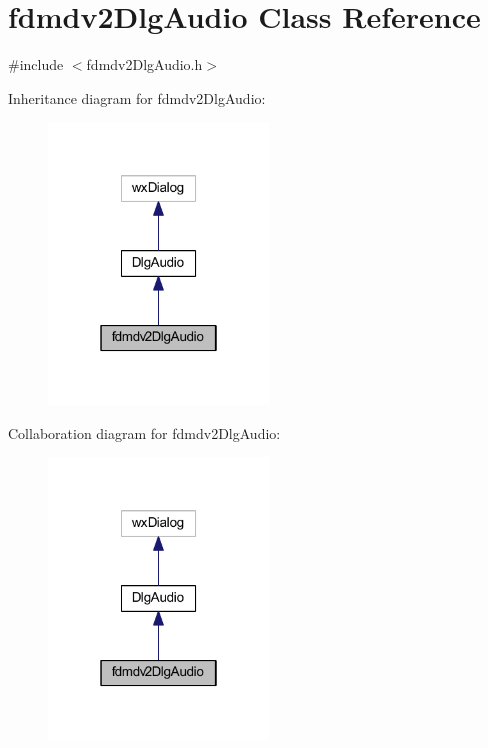 \hypertarget{classfdmdv2_dlg_audio}{\section{fdmdv2\-Dlg\-Audio Class Reference}
\label{classfdmdv2_dlg_audio}
}


{\ttfamily \#include $<$fdmdv2\-Dlg\-Audio.\-h$>$}



Inheritance diagram for fdmdv2\-Dlg\-Audio\-:
\nopagebreak
\begin{figure}[H]
\begin{center}
\leavevmode
\includegraphics[width=166pt]{classfdmdv2_dlg_audio__inherit__graph}
\end{center}
\end{figure}


Collaboration diagram for fdmdv2\-Dlg\-Audio\-:
\nopagebreak
\begin{figure}[H]
\begin{center}
\leavevmode
\includegraphics[width=166pt]{classfdmdv2_dlg_audio__coll__graph}
\end{center}
\end{figure}
